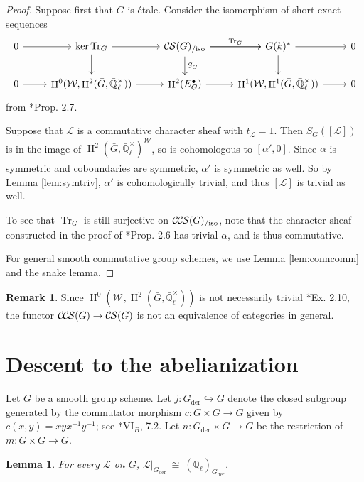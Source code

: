 \documentclass[10pt]{amsart}
\theoremstyle{plain}
\newtheorem{lemma}[theorem]{Lemma}
\theoremstyle{definition}
\newtheorem{remark}[theorem]{Remark}
\newcommand{\EE}{\mathbb{\bar Q}_\ell}
\newcommand{\Fq}{k}
\newcommand{\EEx}{\EE^\times}
\newcommand{\Weil}[1]{\mathcal{W}_{#1}}
\DeclareMathOperator{\Hh}{H}
\newcommand{\der}{_{\operatorname{der}}}
\newcommand{\iso}{{\ \cong\ }}
\newcommand{\trFrob}[1]{t_{#1}}
\newcommand{\TrFrob}[1]{\operatorname{Tr}_{#1}}
\newcommand{\cs}[1]{{\mathcal{#1}}}
\newcommand{\CS}{{\mathcal{C\hskip-0.8pt S}}}
\newcommand{\CCS}{{\mathcal{C\hskip-.8pt C\hskip-0.8pt S}}}
\newcommand{\CSiso}[1]{\CS(#1)_{/\text{iso}}}
\newcommand{\CCSiso}[1]{\CCS(#1)_{/\text{iso}}}
\newcommand{\bG}{\bar{G}}
\begin{document}
\begin{proof}
Suppose first that $G$ is \'etale.  Consider the isomorphism of short exact sequences
\[
\begin{tikzcd}
 0 \arrow{r} & \ker \TrFrob{G} \arrow{d} \arrow{r} & \CSiso{G}\arrow{d}{S_G} \arrow{r}{\TrFrob{G}} \arrow{r} & G(\Fq)^* \arrow{d} \arrow{r} & 0\\
  0 \arrow{r} & \Hh^0(\Weil{},\Hh^2(\bG,\EEx)) \arrow{r} & \Hh^2(E^\bullet_G) \arrow{r} & \Hh^1(\Weil{},\Hh^1(\bG,\EEx)) \arrow{r} & 0
 \end{tikzcd}
 \]
from \cite{cunningham-roe:13a}*{Prop. 2.7}.

Suppose that $\cs{L}$ is a commutative character sheaf
with $\trFrob{\cs{L}} = 1$.  Then $S_G([\cs{L}])$ is in the image of $\Hh^2(\bG, \EEx)^\Weil{}$, so is cohomologous to
$[\alpha', 0]$.  Since $\alpha$ is symmetric and coboundaries are symmetric, $\alpha'$ is symmetric as well.
So by Lemma \ref{lem:symtriv}, $\alpha'$ is cohomologically trivial, and thus $[\cs{L}]$ is trivial as well.

To see that $\TrFrob{G}$ is still surjective on $\CCSiso{G}$, note that the character sheaf constructed in the proof of
\cite{cunningham-roe:13a}*{Prop. 2.6} has trivial $\alpha$, and is thus commutative.

For general smooth commutative group schemes, we use Lemma \ref{lem:conncomm} and the snake lemma.
\end{proof}

\begin{remark}
Since $\Hh^0(\Weil{},\Hh^2(\bG,\EEx))$ is not necessarily trivial \cite{cunningham-roe:13a}*{Ex. 2.10}, the functor
$\CCS(G) \to \CS(G)$ is not an equivalence of categories in general.
\end{remark}

\section{Descent to the abelianization}
  
Let $G$ be a smooth group scheme.
Let $j: G\der \hookrightarrow G$ denote the closed subgroup generated by the commutator morphism $c: G\times G \to G$ given by $c(x,y) = xyx^{-1}y^{-1}$; see \cite{SGA3}*{{VI}$_B$, 7.2}.
Let $n : G\der \times G \to G$ be the restriction of $m: G\times G \to G$.

\begin{lemma}\label{lem:Lder}
For every $\cs{L}$ on $G$, $\cs{L}\vert_{G\der} \iso (\EE)_{G\der}$.
\end{lemma}
\end{document}
